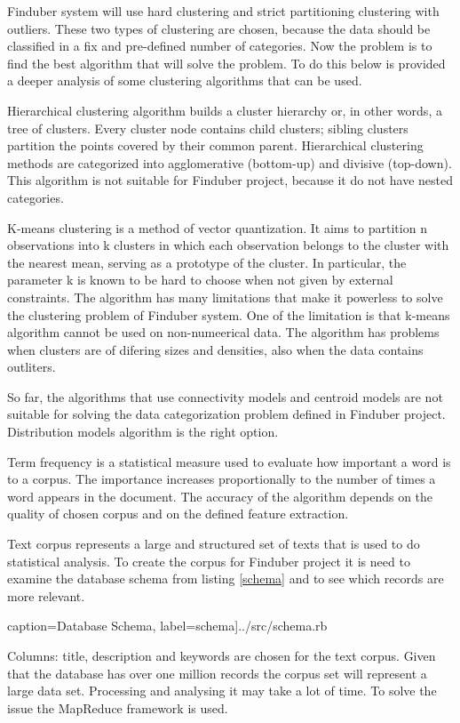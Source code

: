 Finduber system will use hard clustering and strict partitioning clustering with outliers. These two types of clustering are chosen, because the data should be classified in a fix and pre-defined number of categories. Now the problem is to find the best algorithm that will solve the problem. To do this below is provided a deeper analysis of some clustering algorithms that can be used. 

Hierarchical clustering algorithm builds a cluster hierarchy or, in other words, a tree of clusters. Every cluster node contains child clusters; sibling clusters partition the points covered by their common parent. Hierarchical clustering methods are categorized
into agglomerative (bottom-up) and divisive (top-down). This algorithm is not suitable for Finduber project, because it do not have nested categories.

K-means clustering is a method of vector quantization. It aims to partition n observations into k clusters in which each observation belongs to the cluster with the nearest mean, serving as a prototype of the cluster. In particular, the parameter k is known to be hard to choose when not given by external constraints. The algorithm has many limitations that make it powerless to solve the clustering problem of Finduber system. One of the limitation is that k-means algorithm cannot be used on non-numeerical data. The algorithm has problems when clusters are of difering sizes and densities, also when the data contains outliters. 

So far, the algorithms that use connectivity models and centroid models are not suitable for solving the data categorization problem defined in Finduber project. Distribution models algorithm is the right option. 

Term frequency is a statistical measure used to evaluate how important a word is to a corpus. The importance increases proportionally to the number of times a word appears in the document. The accuracy of the algorithm depends on the quality of chosen corpus and on the defined feature extraction. 

Text corpus represents a large and structured set of texts that is used to do statistical analysis. To create the corpus for Finduber project it is need to examine the database schema from listing \ref{schema} and to see which records are more relevant. 

 caption={Database Schema}, label=schema]{../src/schema.rb}

Columns: title, description and keywords are chosen for the text corpus. Given that the database has over one million records the corpus set will represent a large data set. Processing and analysing it may take a lot of time. To solve the issue the MapReduce framework is used. 

